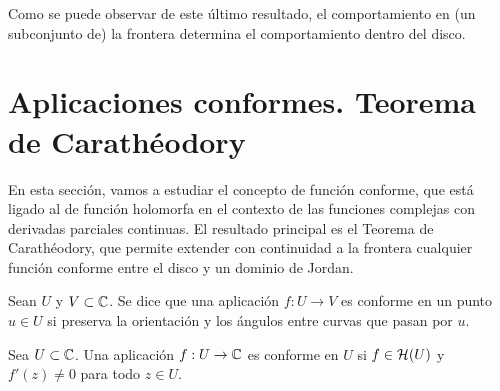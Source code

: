 Como se puede observar de este último resultado, el comportamiento en (un subconjunto de) la frontera determina el comportamiento dentro del disco. \\

\section{Aplicaciones conformes. Teorema de Carathéodory}

En esta sección, vamos a estudiar el concepto de función conforme, que está ligado al de función holomorfa en el contexto de las funciones complejas con derivadas parciales continuas. El resultado principal es el Teorema de Carathéodory, que permite extender con continuidad a la frontera cualquier función conforme entre el disco y un dominio de Jordan. \\

\begin{definition}
    Sean $U$ y $V \subset \mathbb{C}$. Se dice que una aplicación $f: U \to V$ es conforme en un punto $u \in U$ si preserva la orientación y los ángulos entre curvas que pasan por $u$.
\end{definition}
\medskip

\begin{prop}
    Sea $U \subset \mathbb{C}$. Una aplicación $f: U \to \mathbb{C}$ es conforme en $U$ si $f \in \mathcal{H}(U)$ y $f'(z) \not = 0$ para todo $z \in U$.
\end{prop}

